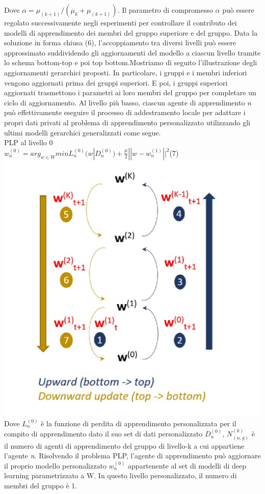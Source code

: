 Dove $\alpha=\mu_{(k+1)}/(\mu_k+\mu_{(k+1)})$. Il parametro di compromesso $\alpha$ può essere regolato successivamente negli esperimenti per controllare il contributo dei modelli di apprendimento dei membri del gruppo superiore e del gruppo. Data la soluzione in forma chiusa (6), l'accoppiamento tra diversi livelli
può essere approssimato suddividendo gli aggiornamenti del modello a ciascun livello tramite lo schema bottom-top e poi top bottom.Mostriamo di seguito l'illustrazione degli aggiornamenti gerarchici proposti. In particolare, i gruppi e i membri inferiori vengono aggiornati prima dei gruppi superiori. E poi, i gruppi superiori aggiornati trasmettono i parametri ai loro membri del gruppo per completare un ciclo di aggiornamento.
Al livello più basso, ciascun agente di apprendimento \textsl{n} può effettivamente eseguire il processo di addestramento locale per adattare i propri dati privati al problema di apprendimento personalizzato utilizzando gli ultimi modelli gerarchici generalizzati come segue.\\
PLP al livello 0\vspace{0.5cm}\\

$w_n^{(0)}=arg_{w\in W}min L_n^{(0)}(w|D_n^{(0)})+\frac{\mu}{2}||w-w_n^{(1)}||^2$\hfill(7)\vspace{0.5cm}\\

\includegraphics[scale=0.3]{BottomUPDOWN}
 \vspace{0.5cm}
Dove $L_n^{(0)}$  è la funzione di perdita di apprendimento personalizzata per il compito di apprendimento dato il suo set di dati personalizzato $D_n^{(0)}$, $N_{(n,g)}^{(k)}$ è il numero di agenti di apprendimento del gruppo di livello-k a cui appartiene l'agente \textsl{n}.
Risolvendo il problema PLP, l'agente di apprendimento può aggiornare il proprio modello personalizzato $w_n^{(0)}$ appartenente al set di modelli di deep learning parametrizzato a W. In questo livello personalizzato, il numero di membri del gruppo è 1.

